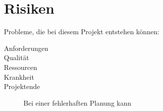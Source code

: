 \section{Risiken}
Probleme, die bei diesem Projekt entstehen können:
\begin{description}
	\item[Anforderungen] 
	\item[Qualität] 
	\item[Ressourcen]
	\item[Krankheit]
	\item[Projektende] Bei einer fehlerhaften Planung kann 
	
\end{description}